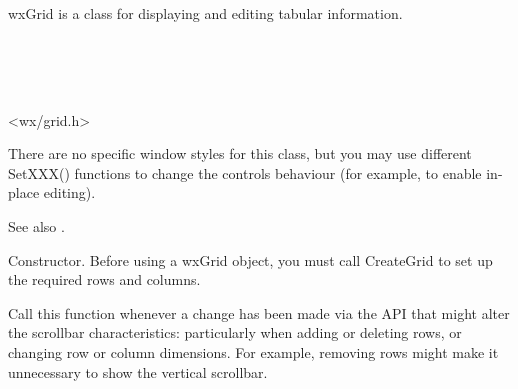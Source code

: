 \section{}\label{wxgrid}

wxGrid is a class for displaying and editing tabular information.


\\
\\
\\


<wx/grid.h>


There are no specific window styles for this class, but you may use different
SetXXX() functions to change the controls behaviour (for example, to enable
in-place editing).

See also .




\label{wxgridconstr}


Constructor. Before using a wxGrid object, you must call CreateGrid to set up the required rows and columns.

\label{wxgridadjustscrollbars}


Call this function whenever a change has been made via the API that might alter the scrollbar characteristics:
particularly when adding or deleting rows, or changing row or column dimensions. For example,
removing rows might make it unnecessary to show the vertical scrollbar.

\label{wxgridappendcols}


